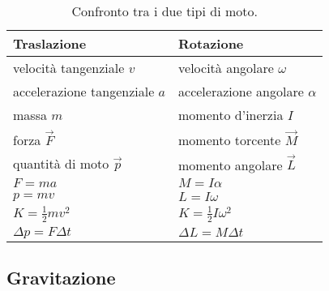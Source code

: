 \documentclass[a4paper,11pt,italian]{article}
\begin{document}
\begin{description}
  \begin{table}[htp]\centering
    \begin{tabular}{ll}\toprule
     \textbf{Traslazione} & \textbf{Rotazione} \\\midrule
     velocità tangenziale $ v $ & velocità angolare $ \omega $ \\\addlinespace[.2em]
     accelerazione tangenziale $ a $ & accelerazione angolare $ \alpha $\\\addlinespace[.2em]
     massa $ m $ & momento d'inerzia $ I $\\\addlinespace[.2em]
     forza $ \vec{F} $ & momento torcente $ \vec{M} $\\\addlinespace[.2em]
     quantità di moto $ \vec{p} $ & momento angolare $ \vec{L} $\\\addlinespace[.2em]
     $ F = ma $ & $ M = I \alpha  $ \\\addlinespace[.2em]
     $ p = mv $ & $ L = I \omega  $ \\\addlinespace[.2em]
     $ K = \frac{1}{2}mv^2 $ & $ K = \frac{1}{2} I\omega^2 $ \\\addlinespace[.2em]
     $ \Delta p = F\Delta t $ & $ \Delta L = M\Delta t $\\\bottomrule
    \end{tabular}
    \caption{Confronto tra i due tipi di moto.}
    \label{tab:traslazionalirotazionali}
  \end{table}  
  
\end{description}


\subsection{Gravitazione}
\end{document}
